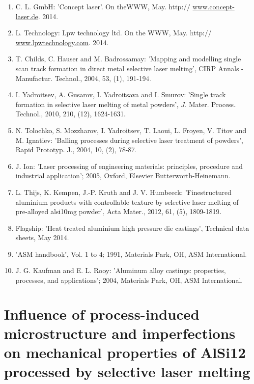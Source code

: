 \documentclass[10pt]{article}
\begin{document}
\begin{enumerate}
  \item C. L. GmbH: 'Concept laser'. On theWWW, May. http:// \href{http://www.concept-laser.de}{www.concept-laser.de}. 2014.

  \item L. Technology: Lpw technology ltd. On the WWW, May. http:// \href{http://www.lpwtechnology.com}{www.lpwtechnology.com}. 2014.

  \item T. Childs, C. Hauser and M. Badrossamay: 'Mapping and modelling single scan track formation in direct metal selective laser melting', CIRP Annals - Manufactur. Technol., 2004, 53, (1), 191-194.

  \item I. Yadroitsev, A. Gusarov, I. Yadroitsava and I. Smurov: 'Single track formation in selective laser melting of metal powders', $J$. Mater. Process. Technol., 2010, 210, (12), 1624-1631.

  \item N. Tolochko, S. Mozzharov, I. Yadroitsev, T. Laoui, L. Froyen, V. Titov and M. Ignatiev: 'Balling processes during selective laser treatment of powders', Rapid Prototyp. J., 2004, 10, (2), 78-87.

  \item J. Ion: 'Laser processing of engineering materials: principles, procedure and industrial application'; 2005, Oxford, Elsevier Butterworth-Heinemann.

  \item L. Thijs, K. Kempen, J.-P. Kruth and J. V. Humbeeck: 'Finestructured aluminium products with controllable texture by selective laser melting of pre-alloyed alsi10mg powder', Acta Mater., 2012, 61, (5), 1809-1819.

  \item Flagship: 'Heat treated aluminium high pressure die castings', Technical data sheets, May 2014.

  \item 'ASM handbook', Vol. 1 to 4; 1991, Materials Park, OH, ASM International.

  \item J. G. Kaufman and E. L. Rooy: 'Aluminum alloy castings: properties, processes, and applications'; 2004, Materials Park, OH, ASM International.

\end{enumerate}

\section*{Influence of process-induced microstructure and imperfections on mechanical properties of AlSi12 processed by selective laser melting }
\end{document}
